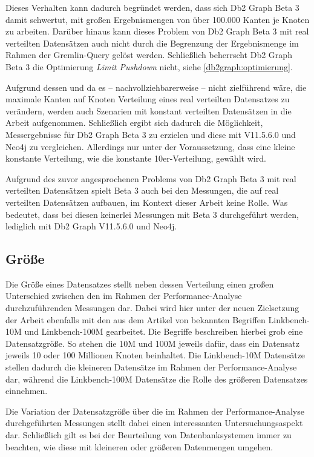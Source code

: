 Dieses Verhalten kann dadurch begründet werden, dass sich Db2 Graph Beta 3 damit schwertut, mit großen Ergebnismengen von über 100.000 Kanten je Knoten zu arbeiten. Darüber hinaus kann dieses Problem von Db2 Graph Beta 3 mit real verteilten Datensätzen auch nicht durch die Begrenzung der Ergebnismenge im Rahmen der Gremlin-Query gelöst werden. Schließlich beherrscht Db2 Graph Beta 3 die Optimierung \textit{Limit Pushdown} nicht, siehe \autoref{db2graph:optimierung}. 

Aufgrund dessen und da es -- nachvollziehbarerweise -- nicht zielführend wäre, die maximale Kanten auf Knoten Verteilung eines real verteilten Datensatzes zu verändern, werden auch Szenarien mit konstant verteilten Datensätzen in die Arbeit aufgenommen. Schließlich ergibt sich dadurch die Möglichkeit, Messergebnisse für Db2 Graph Beta 3 zu erzielen und diese mit V11.5.6.0 und Neo4j zu vergleichen. Allerdings nur unter der Voraussetzung, dass eine kleine konstante Verteilung, wie die konstante 10er-Verteilung, gewählt wird. 

Aufgrund des zuvor angesprochenen Problems von Db2 Graph Beta 3 mit real verteilten Datensätzen spielt Beta 3 auch bei den Messungen, die auf real verteilten Datensätzen aufbauen, im Kontext dieser Arbeit keine Rolle. Was bedeutet, dass bei diesen keinerlei Messungen mit Beta 3 durchgeführt werden, lediglich mit Db2 Graph V11.5.6.0 und Neo4j. 

\subsection{Größe}
Die Größe eines Datensatzes stellt neben dessen Verteilung einen großen Unterschied zwischen den im Rahmen der Performance-Analyse durchzuführenden Messungen dar. Dabei wird hier unter der neuen Zielsetzung der Arbeit ebenfalls mit den aus dem Artikel von \cite{sigmod_tian} bekannten Begriffen Linkbench-10M und Linkbench-100M gearbeitet. Die Begriffe beschreiben hierbei grob eine Datensatzgröße. So stehen die 10M und 100M jeweils dafür, dass ein Datensatz jeweils 10 oder 100 Millionen Knoten beinhaltet. Die Linkbench-10M Datensätze stellen dadurch die kleineren Datensätze im Rahmen der Performance-Analyse dar, während die Linkbench-100M Datensätze die Rolle des größeren Datensatzes einnehmen. 

Die Variation der Datensatzgröße über die im Rahmen der Performance-Analyse durchgeführten Messungen stellt dabei einen interessanten Untersuchungsaspekt dar. Schließlich gilt es bei der Beurteilung von Datenbanksystemen immer zu beachten, wie diese mit kleineren oder größeren Datenmengen umgehen.

